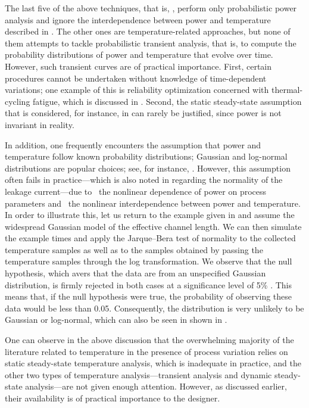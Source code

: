 The last five of the above techniques, that is, \cite{bhardwaj2006,
vrudhula2006, ghanta2006, bhardwaj2008, shen2009}, perform only probabilistic
power analysis and ignore the interdependence between power and temperature
described in . The other ones are temperature-related
approaches, but none of them attempts to tackle probabilistic transient
analysis, that is, to compute the probability distributions of power and
temperature that evolve over time. However, such transient curves are of
practical importance. First, certain procedures cannot be undertaken without
knowledge of time-dependent variations; one example of this is reliability
optimization concerned with thermal-cycling fatigue, which is discussed in
. Second, the static steady-state assumption that is
considered, for instance, in \cite{huang2009a, juan2011, juan2012, lee2013} can
rarely be justified, since power is not invariant in reality.

In addition, one frequently encounters the assumption that power and temperature
follow \apriori known probability distributions; Gaussian and log-normal
distributions are popular choices; see, for instance, \cite{bhardwaj2006,
srivastava2010, juan2012}. However, this assumption often fails in
practice---which is also noted in \cite{juan2012} regarding the normality of the
leakage current---due to \one~the nonlinear dependence of power on process
parameters and \two~the nonlinear interdependence between power and temperature.
In order to illustrate this, let us return to the example given in
 and assume the widespread Gaussian model of the
effective channel length. We can then simulate the example  times
and apply the Jarque--Bera test of normality to the collected temperature
samples as well as to the samples obtained by passing the temperature samples
through the log transformation. We observe that the null hypothesis, which avers
that the data are from an unspecified Gaussian distribution, is firmly rejected
in both cases at a significance level of 5\% \cite{rao2002}. This means that, if
the null hypothesis were true, the probability of observing these data would be
less than 0.05. Consequently, the distribution is very unlikely to be Gaussian
or log-normal, which can also be seen in  shown
in .

One can observe in the above discussion that the overwhelming majority of the
literature related to temperature in the presence of process variation relies on
static steady-state temperature analysis, which is inadequate in practice, and
the other two types of temperature analysis---transient analysis and dynamic
steady-state analysis---are not given enough attention. However, as discussed
earlier, their availability is of practical importance to the designer.

